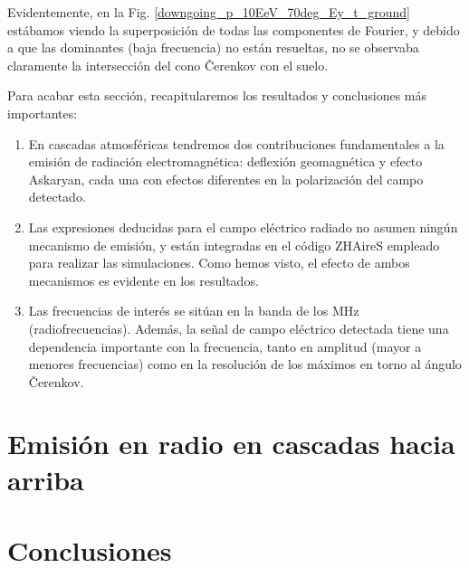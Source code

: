 \documentclass[12 pt, a4paper]{article} %
\numberwithin{equation}{section}
\numberwithin{figure}{section}
\numberwithin{table}{section}
\begin{document}
Evidentemente, en la Fig. \ref{downgoing_p_10EeV_70deg_Ey_t_ground} estábamos viendo la superposición de todas las componentes de Fourier, y debido a que las dominantes (baja frecuencia) no están resueltas, no se observaba claramente la intersección del cono \v{C}erenkov con el suelo.

Para acabar esta sección, recapitularemos los resultados y conclusiones más importantes:
\begin{enumerate}
	\item En cascadas atmosféricas tendremos dos contribuciones fundamentales a la emisión de radiación electromagnética: deflexión geomagnética y efecto Askaryan, cada una con efectos diferentes en la polarización del campo detectado.
	\item Las expresiones deducidas para el campo eléctrico radiado no asumen ningún mecanismo de emisión, y están integradas en el código ZHAireS empleado para realizar las simulaciones. Como hemos visto, el efecto de ambos mecanismos es evidente en los resultados.
	\item Las frecuencias de interés se sitúan en la banda de los $\mathrm{MHz}$ (radiofrecuencias). Además, la señal de campo eléctrico detectada tiene una dependencia importante con la frecuencia, tanto en amplitud (mayor a menores frecuencias) como en la resolución de los máximos en torno al ángulo \v{C}erenkov.
\end{enumerate}
\clearpage

	\section{Emisión en radio en cascadas hacia arriba}
	\clearpage %
	\section{Conclusiones}
	
	
	\clearpage
	\appendix
	
	\nocite{*}
	
	

	
\end{document}
